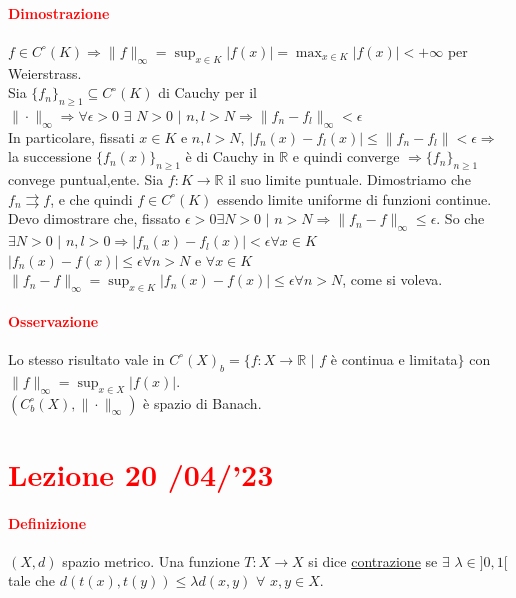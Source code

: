 \documentclass{article}
\newcommand{\R}{\mathbb{R}}
\begin{document}
\paragraph{\textcolor{red}{Dimostrazione}}
$f \in C^\circ(K) \Rightarrow \| f\|_\infty = \sup_{x \in K}|f(x)|= \max_{x \in K}|f(x)|< +\infty$ per Weierstrass.\\
Sia $\{f_n\}_{n \geq 1}\subseteq C^\circ(K)$ di Cauchy per il $\| \cdot\|_\infty \Rightarrow \forall \epsilon >0\,\,  \exists \,\, N >0 \,\, |\,\, n , l >N \Rightarrow \| f_n-f_l \|_\infty <\epsilon$\\
In particolare, fissati $x \in K$ e $n,l >N$, $|f_n(x)-f_l(x)|\leq \| f_n-f_l \|< \epsilon \Rightarrow$ la successione $\{f_n(x)\}_{n \geq 1}$ è di Cauchy in $\R$ e quindi converge $\Rightarrow \{f_n\}_{n \geq 1}$ convege puntual,ente. Sia $ f: K \rightarrow \R$ il suo limite puntuale. Dimostriamo che $ f_n \rightrightarrows f$, e che quindi $f \in C^\circ(K)$ essendo limite uniforme di funzioni continue.\\
Devo dimostrare che, fissato $\epsilon >0  \exists N >0  \,\, | \,\, n >N \Rightarrow \| f_n-f\|_\infty \leq \epsilon$. So che $\exists N >0 \,\, | \,\, n,l>0 \Rightarrow |f_n(x)-f_l(x)|< \epsilon \forall x \in K$ \\
$|f_n(x)-f(x)| \leq \epsilon \forall n > N$ e $\forall x \in K$\\
$\| f_n-f\|_\infty = \sup_{x \in K}|f_n(x)-f(x)| \leq \epsilon \forall n > N$, come si voleva.
\begin{flushright}
\large\Lightning
\end{flushright}

\paragraph{\textcolor{red}{Osservazione}}
Lo stesso risultato vale in $C^\circ(X)_b =\{f:X \rightarrow \R \,\, | \,\, f$ è continua e limitata$\}$ con $\|f\|_\infty = \sup_{x \in X}|f(x)|$.\\
$(C^\circ_b(X),\|\cdot\|_\infty)$ è spazio di Banach.

\newpage
\section{\textcolor{red}{Lezione 20 \space{}/04/'23}}
\paragraph{\textcolor{red}{Definizione}}
$(X,d)$ spazio metrico. Una funzione $T:X\rightarrow X $ si dice \underline{contrazione} se $\exists\,\, \lambda \in ]0,1[$ tale che $d(t(x),t(y))\leq \lambda d(x,y) \,\, \forall\,\, x,y \in X$. 
\end{document}
